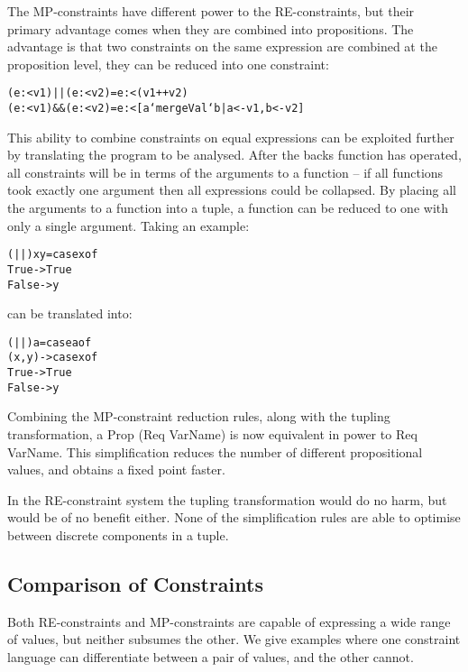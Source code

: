 \documentclass[preprint]{sigplanconf}
\newcommand{\C}[1]{\textsf{#1}}
\newenvironment{code}{\begin{alltt}\small}{\end{alltt}}
\begin{document}
The MP-constraints have different power to the RE-constraints, but their primary advantage comes when they are combined into propositions. The advantage is that two constraints on the same expression are combined at the proposition level, they can be reduced into one constraint:

\begin{code}
(e :< v1) || (e :< v2) = e :< (v1 ++ v2)
(e :< v1) && (e :< v2) = e :< [a `mergeVal` b | a <- v1, b <- v2]
\end{code}

This ability to combine constraints on equal expressions can be exploited further by translating the program to be analysed. After the \C{backs} function has operated, all constraints will be in terms of the arguments to a function -- if all functions took exactly one argument then all expressions could be collapsed. By placing all the arguments to a function into a tuple, a function can be reduced to one with only a single argument. Taking an example:

\begin{code}
(||) x y = case  x of
                 True   -> True
                 False  -> y
\end{code}

\noindent can be translated into:

\begin{code}
(||) a = case  a of
               (x,y) -> case  x of
                              True    -> True
                              False   -> y
\end{code}
 
Combining the MP-constraint reduction rules, along with the tupling transformation, a \C{Prop (Req VarName)} is now equivalent in power to \C{Req VarName}. This simplification reduces the number of different propositional values, and obtains a fixed point faster.

In the RE-constraint system the tupling transformation would do no harm, but would be of no benefit either. None of the simplification rules are able to optimise between discrete components in a tuple.

\subsection{Comparison of Constraints}

Both RE-constraints and MP-constraints are capable of expressing a wide range of values, but neither subsumes the other. We give examples where one constraint language can differentiate between a pair of values, and the other cannot.
\end{document}
